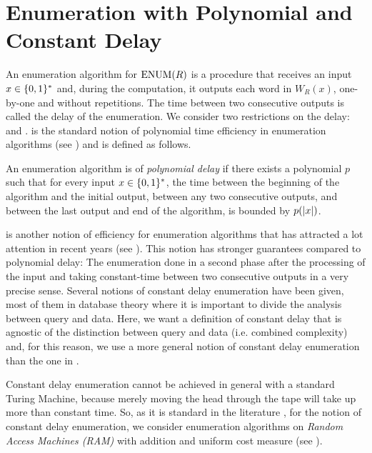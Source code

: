 \documentclass[11pt,twoside=off,numbers=noenddot]{scrbook}
\begin{document}
\section{Enumeration with Polynomial and Constant Delay}
An enumeration algorithm for $\text{ENUM}(R)$ is a procedure that receives an input $x \in \{ 0, 1 \}^\ast$ and, during the computation, it outputs each word in $W_R(x)$, one-by-one and without repetitions. The time between two consecutive outputs is called the delay of the enumeration. We consider two restrictions on the delay:  and .  is the standard notion of polynomial time efficiency in enumeration algorithms (see \cite{johnson1988generating}) and is defined as follows.

\begin{definition}
    An enumeration algorithm is of \emph{polynomial delay} if there exists a polynomial $p$ such that for every input $x \in \{ 0, 1 \}^\ast$, the time between the beginning of the algorithm and the initial output, between any two consecutive outputs, and between the last output and end of the algorithm, is bounded by $p(| x |)$.
\end{definition}

 is another notion of efficiency for enumeration algorithms that has attracted a lot attention in recent years (see \cite{bagan2006mso,courcelle2009linear,segoufin2013enumerating}). This notion has stronger guarantees compared to polynomial delay: The enumeration done in a second phase after the processing of the input and taking constant-time between two consecutive outputs in a very precise sense. Several notions of constant delay enumeration have been given, most of them in database theory where it is important to divide the analysis between query and data. Here, we want a definition of constant delay that is agnostic of the distinction between query and data (i.e. combined complexity) and, for this reason, we use a more general notion of constant delay enumeration than the one in \cite{bagan2006mso,courcelle2009linear,segoufin2013enumerating}.

Constant delay enumeration cannot be achieved in general with a standard Turing Machine, because merely moving the head through the tape will take up more than constant time. So, as it is standard in the literature \cite{segoufin2013enumerating}, for the notion of constant delay enumeration, we consider enumeration algorithms on \emph{Random Access Machines (RAM)} with addition and uniform cost measure (see \cite{aho1974design}).
\end{document}

